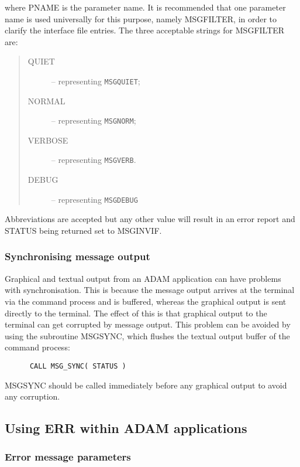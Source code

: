 \documentclass[twoside,11pt]{article}
\newcommand{\xlabel}[1]{}
\renewcommand{\_}{\texttt{\symbol{95}}}
\newcommand{\const}[1]{\texttt{#1}}
\newcommand{\msgnorm}{\const{MSG\_\_NORM}}
\newcommand{\msgverb}{\const{MSG\_\_VERB}}
\newcommand{\msgquiet}{\const{MSG\_\_QUIET}}
\newcommand{\msgdebug}{\const{MSG\_\_DEBUG}}
\begin{document}
where PNAME is the parameter name.
It is recommended that one parameter name is used universally for this purpose,
namely MSG\_FILTER, in order to clarify the interface file entries.
The three acceptable strings for MSG\_FILTER are:

\begin {quote}
\begin {description}
\item [QUIET] -- representing \msgquiet;
\item [NORMAL] -- representing \msgnorm;
\item [VERBOSE] -- representing \msgverb.
\item [DEBUG] -- representing \msgdebug\
\end {description}
\end {quote}
Abbreviations are accepted but
any other value will result in an error report and STATUS being
returned set to MSG\_\_INVIF.


\subsubsection{\xlabel{synchronising_message_output}Synchronising message output}

Graphical and textual output from an ADAM application can have problems with
synchronisation.
This is because the message output arrives at the terminal via the command
process and is buffered, whereas the graphical output is sent directly to the
terminal.
The effect of this is that graphical output to the terminal can get corrupted by
message output.
This problem can be avoided by using the subroutine MSG\_SYNC, which flushes
the textual output buffer of the command process:

\begin {small}
\begin{verbatim}
      CALL MSG_SYNC( STATUS )
\end{verbatim}
\end {small}

MSG\_SYNC should be called immediately before any graphical output to avoid any
corruption.


\subsection{\xlabel{using_err_within_adam_applications}Using ERR within ADAM applications \label{adam_err}}

\subsubsection{\xlabel{error_message_parameters}Error message parameters}
\end{document}
